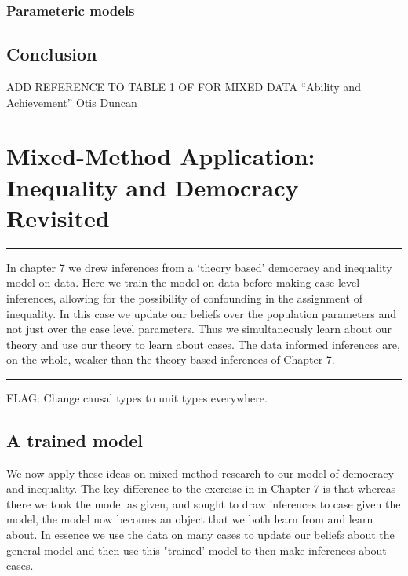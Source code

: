 \documentclass[12pt,]{book}
\begin{document}
\hypertarget{parameteric-models}{%
\subsection{Parameteric models}\label{parameteric-models}}

\hypertarget{conclusion-1}{%
\section{Conclusion}\label{conclusion-1}}

ADD REFERENCE TO TABLE 1 OF FOR MIXED DATA ``Ability and Achievement'' Otis Duncan

\hypertarget{mixingapp}{%
\chapter{Mixed-Method Application: Inequality and Democracy Revisited}\label{mixingapp}}

\begin{center}\rule{0.5\linewidth}{\linethickness}\end{center}

In chapter 7 we drew inferences from a `theory based' democracy and inequality model on data. Here we train the model on data before making case level inferences, allowing for the possibility of confounding in the assignment of inequality. In this case we update our beliefs over the population parameters and not just over the case level parameters. Thus we simultaneously learn about our theory and use our theory to learn about cases. The data informed inferences are, on the whole, weaker than the theory based inferences of Chapter 7.

\begin{center}\rule{0.5\linewidth}{\linethickness}\end{center}

FLAG: Change causal types to unit types everywhere.

\hypertarget{a-trained-model}{%
\section{A trained model}\label{a-trained-model}}

We now apply these ideas on mixed method research to our model of democracy and inequality. The key difference to the exercise in in Chapter 7 is that whereas there we took the model as given, and sought to draw inferences to case given the model, the model now becomes an object that we both learn from and learn about. In essence we use the data on many cases to update our beliefs about the general model and then use this "trained' model to then make inferences about cases.
\end{document}
